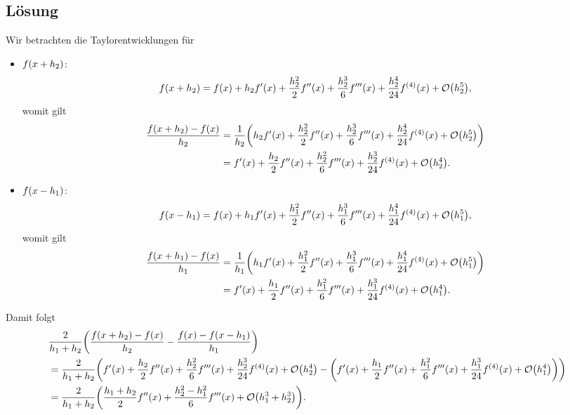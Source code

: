 \documentclass{exercise}
\begin{document}
    \subsection*{Lösung}
    Wir betrachten die Taylorentwicklungen für
    \begin{itemize}
        \item \(f\parentheses*{x + h_2}\):
        \[
            f\parentheses*{x + h_2} = f\parentheses*{x} + h_2 f'\parentheses*{x} + \frac{h_2^2}{2}f''\parentheses*{x} + \frac{h_2^3}{6}f'''\parentheses*{x} + \frac{h_2^4}{24}f^{\parentheses*{4}}\parentheses*{x} + \mathcal{O}\parentheses*{h_2^5},
        \]
        womit gilt
        \begin{align*}
            \frac{f\parentheses*{x + h_2} - f\parentheses*{x}}{h_2} &= \frac{1}{h_2}\parentheses*{h_2 f'\parentheses*{x} + \frac{h_2^2}{2}f''\parentheses*{x} + \frac{h_2^3}{6}f'''\parentheses*{x} + \frac{h_2^4}{24}f^{\parentheses*{4}}\parentheses*{x} + \mathcal{O}\parentheses*{h_2^5}}\\
            &= f'\parentheses*{x} + \frac{h_2}{2}f''\parentheses*{x} + \frac{h_2^2}{6}f'''\parentheses*{x} + \frac{h_2^3}{24}f^{\parentheses*{4}}\parentheses*{x} + \mathcal{O}\parentheses*{h_2^4}.
        \end{align*}
        \item \(f\parentheses*{x - h_1}\):
        \[
            f\parentheses*{x - h_1} = f\parentheses*{x} + h_1 f'\parentheses*{x} + \frac{h_1^2}{2}f''\parentheses*{x} + \frac{h_1^3}{6}f'''\parentheses*{x} + \frac{h_1^4}{24}f^{\parentheses*{4}}\parentheses*{x} + \mathcal{O}\parentheses*{h_1^5},
        \]
        womit gilt
        \begin{align*}
            \frac{f\parentheses*{x + h_1} - f\parentheses*{x}}{h_1} &= \frac{1}{h_1}\parentheses*{h_1 f'\parentheses*{x} + \frac{h_1^2}{2}f''\parentheses*{x} + \frac{h_1^3}{6}f'''\parentheses*{x} + \frac{h_1^4}{24}f^{\parentheses*{4}}\parentheses*{x} + \mathcal{O}\parentheses*{h_1^5}}\\
            &= f'\parentheses*{x} + \frac{h_1}{2}f''\parentheses*{x} + \frac{h_1^2}{6}f'''\parentheses*{x} + \frac{h_1^3}{24}f^{\parentheses*{4}}\parentheses*{x} + \mathcal{O}\parentheses*{h_1^4}.
        \end{align*}
    \end{itemize}
    Damit folgt
    \begin{align*}
        &\frac{2}{h_1 + h_2}\parentheses*{\frac{f\parentheses*{x + h_2} - f\parentheses*{x}}{h_2} - \frac{f\parentheses*{x} - f\parentheses*{x - h_1}}{h_1}}\\
        &= \frac{2}{h_1 + h_2}\parentheses*{f'\parentheses*{x} + \frac{h_2}{2}f''\parentheses*{x} + \frac{h_2^2}{6}f'''\parentheses*{x} + \frac{h_2^3}{24}f^{\parentheses*{4}}\parentheses*{x} + \mathcal{O}\parentheses*{h_2^4} - \parentheses*{f'\parentheses*{x} + \frac{h_1}{2}f''\parentheses*{x} + \frac{h_1^2}{6}f'''\parentheses*{x} + \frac{h_1^3}{24}f^{\parentheses*{4}}\parentheses*{x} + \mathcal{O}\parentheses*{h_1^4}}}\\
        &= \frac{2}{h_1 + h_2}\parentheses*{\frac{h_1 + h_2}{2}f''\parentheses*{x} + \frac{h_2^2 - h_1^2}{6}f'''\parentheses*{x} + \mathcal{O}\parentheses*{h_1^3 + h_2^3}}.
    \end{align*}
\end{document}
